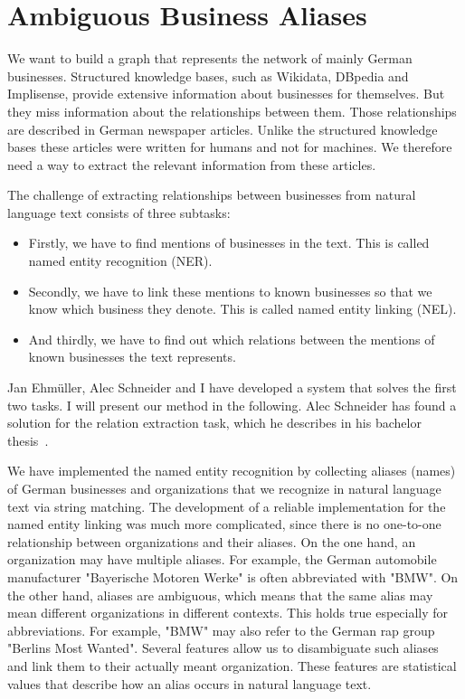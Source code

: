 \section{Ambiguous Business Aliases}
We want to build a graph that represents the network of mainly German businesses. Structured knowledge bases, such as Wikidata, DBpedia and Implisense, provide extensive information about businesses for themselves. But they miss information about the relationships between them. Those relationships are described in German newspaper articles. Unlike the structured knowledge bases these articles were written for humans and not for machines. We therefore need a way to extract the relevant information from these articles.

The challenge of extracting relationships between businesses from natural language text consists of three subtasks:
\begin{itemize}
\item Firstly, we have to find mentions of businesses in the text. This is called named entity recognition (NER).
\item Secondly, we have to link these mentions to known businesses so that we know which business they denote. This is called named entity linking (NEL).
\item And thirdly, we have to find out which relations between the mentions of known businesses the text represents.
\end{itemize}
Jan Ehmüller, Alec Schneider and I have developed a system that solves the first two tasks. I will present our method in the following. Alec Schneider has found a solution for the relation extraction task, which he describes in his bachelor thesis~\cite{Alec}.

We have implemented the named entity recognition by collecting aliases (names) of German businesses and organizations that we recognize in natural language text via string matching. The development of a reliable implementation for the named entity linking was much more complicated, since there is no one-to-one relationship between organizations and their aliases. On the one hand, an organization may have multiple aliases. For example, the German automobile manufacturer "Bayerische Motoren Werke" is often abbreviated with "BMW". On the other hand, aliases are ambiguous, which means that the same alias may mean different organizations in different contexts. This holds true especially for abbreviations. For example, "BMW" may also refer to the German rap group "Berlins Most Wanted".
Several features allow us to disambiguate such aliases and link them to their actually meant organization. These features are statistical values that describe how an alias occurs in natural language text.


